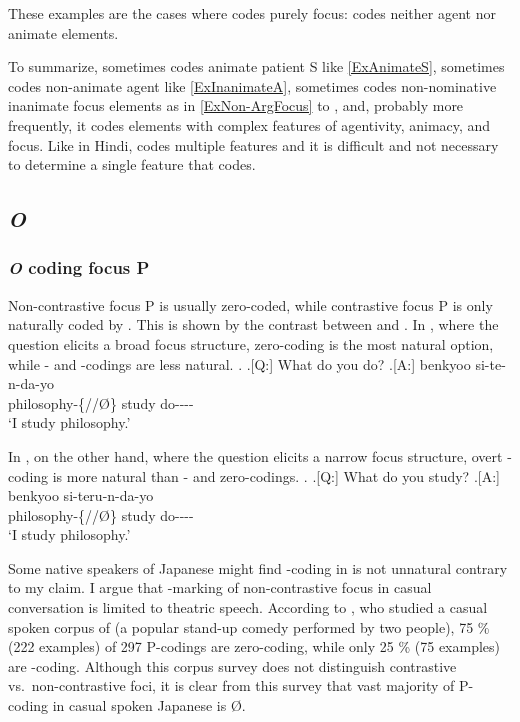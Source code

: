 These examples are the cases where  codes purely focus:
 codes neither agent nor animate elements.


To summarize,
 sometimes codes animate patient S like \ref{ExAnimateS},
sometimes codes non-animate agent like \ref{ExInanimateA},
sometimes codes non-nominative inanimate focus elements as in \ref{ExNon-ArgFocus} to \Last, and,
probably more frequently,
it codes elements with complex features of agentivity, animacy, and focus.
Like  in Hindi,
 codes multiple features
and it is difficult and not necessary to determine a single feature that  codes.


\subsection{\textit{O}}

\subsubsection{\textit{O} coding focus P}

Non-contrastive focus P is usually zero-coded,
while contrastive focus P is only naturally coded by .
This is shown by the contrast between \Next and \NNext.
In \Next,
where the question elicits a broad focus structure,
zero-coding is the most natural option,
while - and -codings are less natural.
%
\ex.\label{ExfocusP}
	\a.[Q:] What do you do?
	\bg.[A:]  benkyoo si-te-n-da-yo \\
		philosophy-\{//\O\} study do---- \\
		`I study philosophy.'

In \Next,
on the other hand,
where the question elicits a narrow focus structure,
overt -coding is more natural than - and zero-codings.
%
\ex. 
	\a.[Q:] What do you study?
	\bg.[A:]  benkyoo si-teru-n-da-yo \\
		philosophy-\{//\O\} study do---- \\
		`I study philosophy.'


Some native speakers of Japanese might find -coding in \LLast is not unnatural contrary to my claim.
I argue that -marking of non-contrastive focus in casual conversation
is limited to theatric speech.
According to 
, who studied a casual spoken corpus of 
(a popular stand-up comedy performed by two people),
75 \% (222 examples) of 297 P-codings are zero-coding,
while only 25 \% (75 examples) are -coding.
Although this corpus survey does not distinguish contrastive vs.\ non-contrastive foci,
it is clear from this survey that
vast majority of P-coding in casual spoken Japanese is {\O}.

